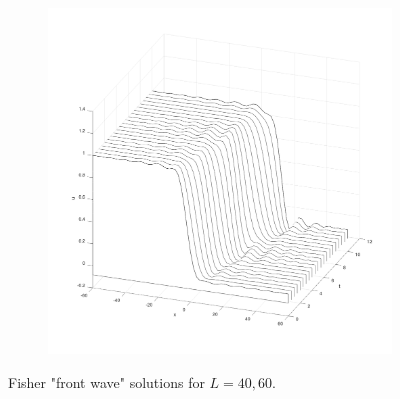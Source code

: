 \begin{solution}
\begin{figure}[h]
\begin{subfigure}[b]{0.49\textwidth}
            \includegraphics[width=\textwidth]{problem_2ii_L60.png}
        \end{subfigure}
        \caption{Fisher "front wave" solutions for $L = 40, 60$.}
        \label{fig:problem2ii_L30_L60}
    \end{figure}
    \ \\
\end{solution}